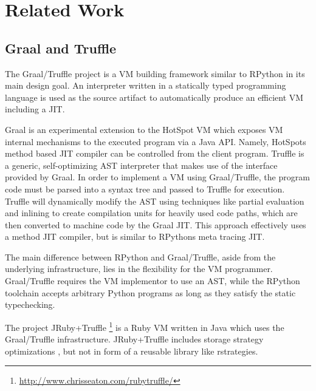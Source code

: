 
\section{Related Work}


\subsection{Graal and Truffle}

The Graal/Truffle project is a VM building framework similar to RPython in its main design goal.
An interpreter written in a statically typed programming language is used as the source artifact to automatically produce an efficient VM including a JIT.

Graal \cite{graal} is an experimental extension to the HotSpot VM which exposes VM internal mechanisms to the executed program via a Java API.
Namely, HotSpots method based JIT compiler can be controlled from the client program.
Truffle \cite{truffle} is a generic, self-optimizing AST interpreter that makes use of the interface provided by Graal.
In order to implement a VM using Graal/Truffle, the program code must be parsed into a syntax tree and passed to Truffle for execution.
Truffle will dynamically modify the AST using techniques like partial evaluation and inlining to create compilation units for heavily used code paths, which are then converted to machine code by the Graal JIT.
This approach effectively uses a method JIT compiler, but is similar to RPythons meta tracing JIT.

The main difference between RPython and Graal/Truffle, aside from the underlying infrastructure, lies in the flexibility for the VM programmer.
Graal/Truffle requires the VM implementor to use an AST, while the RPython toolchain accepts arbitrary Python programs as long as they satisfy the static typechecking.

The project JRuby+Truffle \footnote{\url{http://www.chrisseaton.com/rubytruffle/}} is a Ruby VM written in Java which uses the Graal/Truffle infrastructure.
JRuby+Truffle includes storage strategy optimizations \cite{smallDataStructures}, but not in form of a reusable library like rstrategies.

